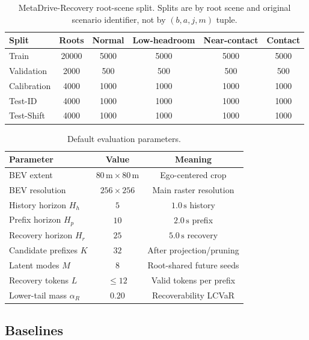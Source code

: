 \documentclass[conference]{IEEEtran}
\begin{document}
\begin{table}[t]
\centering
\caption{MetaDrive-Recovery root-scene split.  Splits are by root scene and original scenario identifier, not by $(b,a,j,m)$ tuple.}
\label{tab:dataset_split}
\begin{tabular}{lccccc}
\toprule
Split & Roots & Normal & Low-headroom & Near-contact & Contact \\
\midrule
Train & 20000 & 5000 & 5000 & 5000 & 5000 \\
Validation & 2000 & 500 & 500 & 500 & 500 \\
Calibration & 4000 & 1000 & 1000 & 1000 & 1000 \\
Test-ID & 4000 & 1000 & 1000 & 1000 & 1000 \\
Test-Shift & 4000 & 1000 & 1000 & 1000 & 1000 \\
\bottomrule
\end{tabular}
\end{table}

\begin{table}[t]
\centering
\caption{Default evaluation parameters.}
\label{tab:dataset_params}
\begin{tabular}{lcc}
\toprule
Parameter & Value & Meaning \\
\midrule
BEV extent & $80\,\mathrm{m}\times80\,\mathrm{m}$ & Ego-centered crop \\
BEV resolution & $256\times256$ & Main raster resolution \\
History horizon $H_h$ & $5$ & $1.0\,\mathrm{s}$ history \\
Prefix horizon $H_p$ & $10$ & $2.0\,\mathrm{s}$ prefix \\
Recovery horizon $H_r$ & $25$ & $5.0\,\mathrm{s}$ recovery \\
Candidate prefixes $K$ & $32$ & After projection/pruning \\
Latent modes $M$ & $8$ & Root-shared future seeds \\
Recovery tokens $L$ & $\le12$ & Valid tokens per prefix \\
Lower-tail mass $\alpha_R$ & $0.20$ & Recoverability LCVaR \\
\bottomrule
\end{tabular}
\end{table}

\subsection{Baselines}
\label{subsec:baselines}
\end{document}
